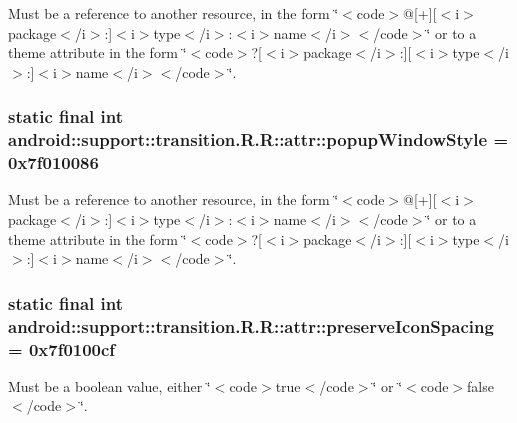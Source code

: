 Must be a reference to another resource, in the form \char`\"{}$<$code$>$@\mbox{[}+\mbox{]}\mbox{[}$<$i$>$package$<$/i$>$:\mbox{]}$<$i$>$type$<$/i$>$:$<$i$>$name$<$/i$>$$<$/code$>$\char`\"{} or to a theme attribute in the form \char`\"{}$<$code$>$?\mbox{[}$<$i$>$package$<$/i$>$:\mbox{]}\mbox{[}$<$i$>$type$<$/i$>$:\mbox{]}$<$i$>$name$<$/i$>$$<$/code$>$\char`\"{}. \hypertarget{classandroid_1_1support_1_1transition_1_1_r_1_1attr_fcda792469964589b9ccf3389a161241}{
\subsubsection[{popupWindowStyle}]{\setlength{\rightskip}{0pt plus 5cm}static final int android::support::transition.R.R::attr::popupWindowStyle = 0x7f010086}}
\label{classandroid_1_1support_1_1transition_1_1_r_1_1attr_fcda792469964589b9ccf3389a161241}


Must be a reference to another resource, in the form \char`\"{}$<$code$>$@\mbox{[}+\mbox{]}\mbox{[}$<$i$>$package$<$/i$>$:\mbox{]}$<$i$>$type$<$/i$>$:$<$i$>$name$<$/i$>$$<$/code$>$\char`\"{} or to a theme attribute in the form \char`\"{}$<$code$>$?\mbox{[}$<$i$>$package$<$/i$>$:\mbox{]}\mbox{[}$<$i$>$type$<$/i$>$:\mbox{]}$<$i$>$name$<$/i$>$$<$/code$>$\char`\"{}. \hypertarget{classandroid_1_1support_1_1transition_1_1_r_1_1attr_38da914a301e4b5f4c5637c3b8ec59e1}{
\subsubsection[{preserveIconSpacing}]{\setlength{\rightskip}{0pt plus 5cm}static final int android::support::transition.R.R::attr::preserveIconSpacing = 0x7f0100cf}}
\label{classandroid_1_1support_1_1transition_1_1_r_1_1attr_38da914a301e4b5f4c5637c3b8ec59e1}


Must be a boolean value, either \char`\"{}$<$code$>$true$<$/code$>$\char`\"{} or \char`\"{}$<$code$>$false$<$/code$>$\char`\"{}. 

